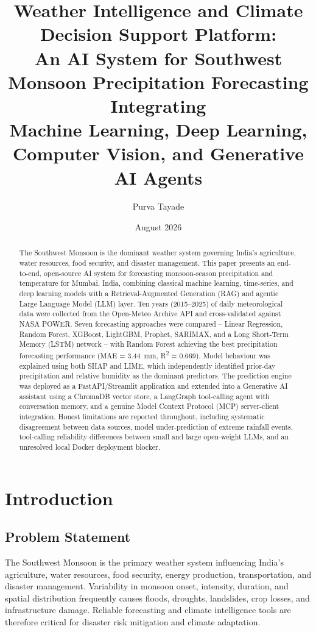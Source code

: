 \documentclass[11pt]{article}
\title{Weather Intelligence and Climate Decision Support Platform: \\
An AI System for Southwest Monsoon Precipitation Forecasting Integrating \\
Machine Learning, Deep Learning, Computer Vision, and Generative AI Agents}
\author[1]{Purva Tayade}
\affil[1]{Generative AI Research Internship, MacroEdtech}
\date{August 2026}
\begin{document}
\maketitle

\begin{abstract}
The Southwest Monsoon is the dominant weather system governing India's agriculture, water resources, food security, and disaster management. This paper presents an end-to-end, open-source AI system for forecasting monsoon-season precipitation and temperature for Mumbai, India, combining classical machine learning, time-series, and deep learning models with a Retrieval-Augmented Generation (RAG) and agentic Large Language Model (LLM) layer. Ten years (2015--2025) of daily meteorological data were collected from the Open-Meteo Archive API and cross-validated against NASA POWER. Seven forecasting approaches were compared -- Linear Regression, Random Forest, XGBoost, LightGBM, Prophet, SARIMAX, and a Long Short-Term Memory (LSTM) network -- with Random Forest achieving the best precipitation forecasting performance (MAE = 3.44~mm, R\textsuperscript{2} = 0.669). Model behaviour was explained using both SHAP and LIME, which independently identified prior-day precipitation and relative humidity as the dominant predictors. The prediction engine was deployed as a FastAPI/Streamlit application and extended into a Generative AI assistant using a ChromaDB vector store, a LangGraph tool-calling agent with conversation memory, and a genuine Model Context Protocol (MCP) server-client integration. Honest limitations are reported throughout, including systematic disagreement between data sources, model under-prediction of extreme rainfall events, tool-calling reliability differences between small and large open-weight LLMs, and an unresolved local Docker deployment blocker.
\end{abstract}

\section{Introduction}

\subsection{Problem Statement}
The Southwest Monsoon is the primary weather system influencing India's agriculture, water resources, food security, energy production, transportation, and disaster management. Variability in monsoon onset, intensity, duration, and spatial distribution frequently causes floods, droughts, landslides, crop losses, and infrastructure damage. Reliable forecasting and climate intelligence tools are therefore critical for disaster risk mitigation and climate adaptation.
\end{document}
